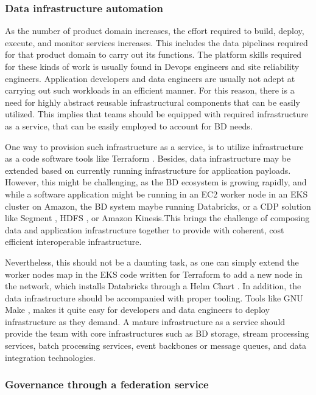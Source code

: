\documentclass[review]{elsarticle}
\begin{document}
\subsubsection{Data infrastructure automation}

As the number of product domain increases, the effort required to build, deploy, execute, and monitor services increases. This includes the data pipelines required for that product domain to carry out its functions. The platform skills required for these kinds of work is usually found in Devops engineers and site reliability engineers. Application developers and data engineers are usually not adept at carrying out such workloads in an efficient manner. For this reason, there is a need for highly abstract reusable infrastructural components that can be easily utilized. This implies that teams should be equipped with required infrastructure as a service, that can be easily employed to account for BD needs.

One way to provision such infrastructure as a service, is to utilize infrastructure as a code software tools like Terraform \cite{Terraform}. Besides, data infrastructure may be extended based on currently running infrastructure for application payloads. However, this might be challenging, as the BD ecosystem is growing rapidly, and while a software application might be running in an EC2 worker node in an EKS cluster on Amazon, the BD system maybe running Databricks, or a CDP solution like Segment \cite{Segment}, HDFS \cite{HDFS}, or Amazon Kinesis.This brings the challenge of composing data and application infrastructure together to provide with coherent, cost efficient interoperable infrastructure.

Nevertheless, this should not be a daunting task, as one can simply extend the worker nodes map in the EKS code written for Terraform to add a new node in the network, which installs Databricks through a Helm Chart \cite{Helm}. In addition, the data infrastructure should be accompanied with proper tooling. Tools like GNU Make \cite{Make}, makes it quite easy for developers and data engineers to deploy infrastructure as they demand.
A mature infrastructure as a service should provide the team with core infrastructures such as BD storage, stream processing services, batch processing services, event backbones or message queues, and data integration technologies.

\subsubsection{Governance through a federation service}
\end{document}

